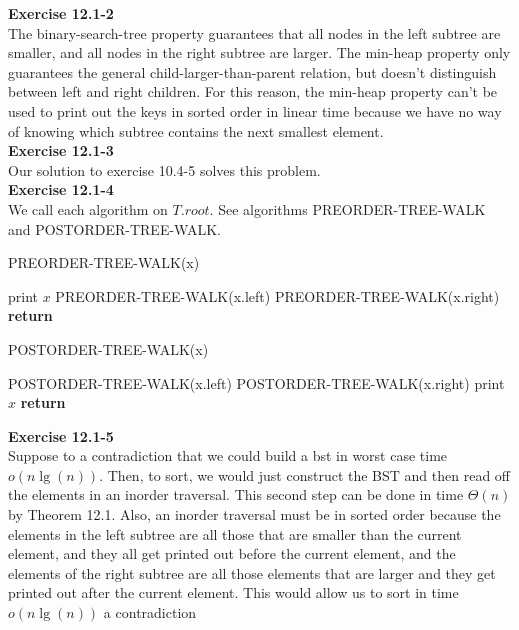 \documentclass{article}
\begin{document}
\noindent\textbf{Exercise 12.1-2}\\

The binary-search-tree property guarantees that all nodes in the left subtree are smaller, and all nodes in the right subtree are larger. The min-heap property only guarantees the general child-larger-than-parent relation, but doesn't distinguish between left and right children.  For this reason, the min-heap property can't be used to print out the keys in sorted order in linear time because we have no way of knowing which subtree contains the next smallest element. \\

\noindent\textbf{ Exercise 12.1-3} \\

Our solution to exercise 10.4-5 solves this problem.\\

\noindent\textbf{Exercise 12.1-4}\\

We call each algorithm on $T.root$. See algorithms PREORDER-TREE-WALK and POSTORDER-TREE-WALK.\\
\begin{algorithm}
\caption{PREORDER-TREE-WALK(x)}
\begin{algorithmic}
	\State print $x$
	\State PREORDER-TREE-WALK(x.left)
	\State PREORDER-TREE-WALK(x.right)
\EndIf
\State \textbf{return}
\end{algorithmic}
\end{algorithm}

\begin{algorithm}
\caption{POSTORDER-TREE-WALK(x)}
\begin{algorithmic}
	\State POSTORDER-TREE-WALK(x.left)
	\State POSTORDER-TREE-WALK(x.right)
	\State print $x$
\EndIf
\State \textbf{return}
\end{algorithmic}
\end{algorithm}


\noindent\textbf{ Exercise 12.1-5} \\

Suppose to a contradiction that we could build a bst in worst case time $o(n\lg(n))$. Then, to sort, we would just construct the BST and then read off the elements in an inorder traversal. This second step can be done in time $\Theta(n)$ by Theorem 12.1. Also, an inorder traversal must be in sorted order because the elements in the left subtree are all those that are smaller than the current element, and they all get printed out before the current element, and the elements of the right subtree are all those elements that are larger and they get printed out  after the current element. This would allow us to sort in time $o(n\lg(n))$ a contradiction\\
\end{document}

